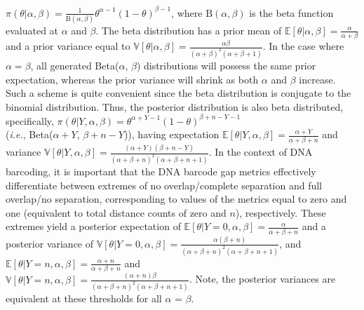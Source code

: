 \documentclass[12pt]{article}
\begin{document}
$\pi(\theta|\alpha, \beta) = \frac{1}{\textrm{B}(\alpha, \beta)} \theta^{\alpha-1}(1-\theta)^{\beta-1}$, where $\textrm{B}(\alpha, \beta)$ is the beta function evaluated at $\alpha$ and $\beta$. The beta distribution has a prior mean of $\mathbb{E}[\theta | \alpha, \beta] = \frac{\alpha}{\alpha + \beta}$ and a prior variance equal to $\mathbb{V}[\theta | \alpha, \beta] = \frac{\alpha\beta}{(\alpha + \beta)^2(\alpha + \beta + 1)}$. In the case where $\alpha = \beta$, all generated Beta($\alpha$, $\beta$) distributions will possess the same prior expectation, whereas the prior variance will shrink as both $\alpha$ and $\beta$ increase. Such a scheme is quite convenient since the beta distribution is conjugate to the binomial distribution. Thus, the posterior distribution is also beta distributed, specifically, $\pi(\theta|Y, \alpha, \beta) = \theta^{\alpha+Y-1}(1-\theta)^{\beta+n-Y-1}$ \\ (\textit{i.e.}, Beta($\alpha + Y$, $\beta + n - Y$)), having expectation $\mathbb{E}[\theta|Y, \alpha, \beta] = \frac{\alpha + Y}{\alpha + \beta + n}$ and variance $\mathbb{V}[\theta|Y, \alpha, \beta] = \frac{(\alpha + Y)(\beta + n - Y)}{(\alpha + \beta + n)^2(\alpha + \beta + n + 1)}$. In the context of DNA barcoding, it is important that the DNA barcode gap metrics effectively differentiate between extremes of no overlap/complete separation and full overlap/no separation, corresponding to values of the metrics equal to zero and one (equivalent to total distance counts of zero and $n$), respectively. These extremes yield a posterior expectation of $\mathbb{E}[\theta|Y = 0, \alpha, \beta] = \frac{\alpha}{\alpha + \beta + n}$ and a posterior variance of $\mathbb{V}[\theta|Y = 0, \alpha, \beta] = \frac{\alpha(\beta + n)}{(\alpha + \beta + n)^2(\alpha + \beta + n + 1)}$, and $\mathbb{E}[\theta|Y = n, \alpha, \beta] = \frac{\alpha + n}{\alpha + \beta + n}$ and \\ $\mathbb{V}[\theta|Y = n, \alpha, \beta] = \frac{(\alpha + n)\beta}{(\alpha + \beta + n)^2(\alpha + \beta + n + 1)}$. Note, the posterior variances are equivalent at these thresholds for all $\alpha$ = $\beta$.
\end{document}
